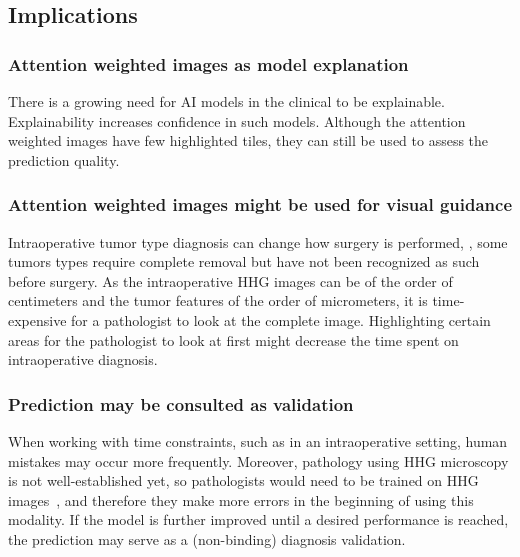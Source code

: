 \subsection{Implications}

\subsubsection{Attention weighted images as model explanation}
There is a growing need for AI models in the clinical to be explainable.
Explainability increases confidence in such models.
Although the attention weighted images have few highlighted tiles, they can still be used to assess the prediction quality.

\subsubsection{Attention weighted images might be used for visual guidance}
Intraoperative tumor type diagnosis can change how surgery is performed, \eg, some tumors types require complete removal but have not been recognized as such before surgery.
As the intraoperative HHG images can be of the order of centimeters and the tumor features of the order of micrometers, it is time-expensive for a pathologist to look at the complete image.
Highlighting certain areas for the pathologist to look at first might decrease the time spent on intraoperative diagnosis.

\subsubsection{Prediction may be consulted as validation}
When working with time constraints, such as in an intraoperative setting, human mistakes may occur more frequently.
Moreover, pathology using HHG microscopy is not well-established yet, so pathologists would need to be trained on HHG images~\cite{Spies2023}, and therefore they make more errors in the beginning of using this modality.
If the model is further improved until a desired performance is reached, the prediction may serve as a (non-binding) diagnosis validation.
